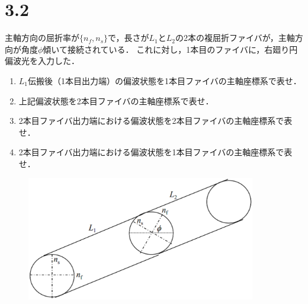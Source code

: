 \section*{3.2}
主軸方向の屈折率が$\{n_f, n_s\}$で，長さが$L_1$と$L_2$の2本の複屈折ファイバが，主軸方向が角度$\phi$傾いて接続されている．
これに対し，1本目のファイバに，右廻り円偏波光を入力した．
\begin{enumerate}
    \renewcommand{\labelenumi}{(\alph{enumi})}
    \item $L_1$伝搬後（1本目出力端）の偏波状態を1本目ファイバの主軸座標系で表せ．
    \item 上記偏波状態を2本目ファイバの主軸座標系で表せ．
    \item 2本目ファイバ出力端における偏波状態を2本目ファイバの主軸座標系で表せ．
    \item 2本目ファイバ出力端における偏波状態を1本目ファイバの主軸座標系で表せ．
\end{enumerate}
\begin{figure}[H]
    \begin{center}
        \includegraphics[width=100mm]{./figures/fig.eps}
    \end{center}
\end{figure}


